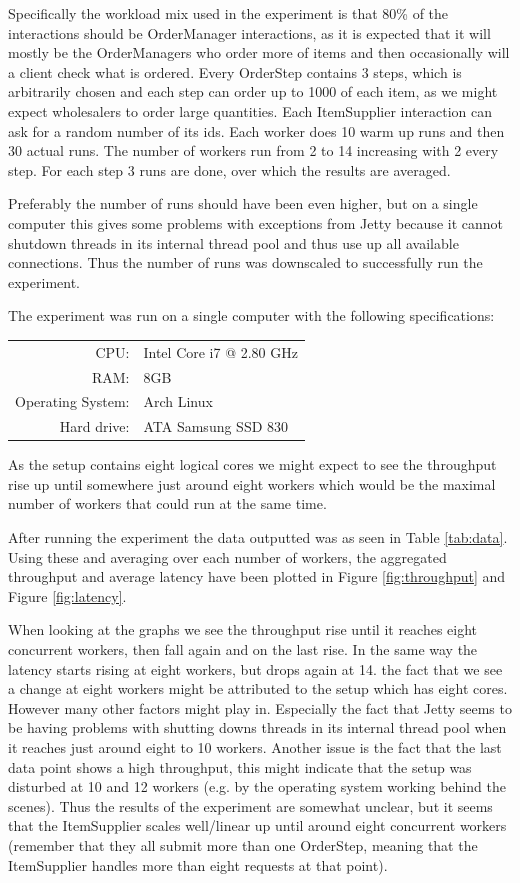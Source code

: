 \documentclass[a4paper, 11pt]{article}
\begin{document}
Specifically the workload mix used in the experiment is that 80\% of the interactions should be OrderManager interactions, as it is expected that it will mostly be the OrderManagers who order more of items and then occasionally will a client check what is ordered. Every OrderStep contains 3 steps, which is arbitrarily chosen and each step can order up to 1000 of each item, as we might expect wholesalers to order large quantities. Each ItemSupplier interaction can ask for a random number of its ids. Each worker does 10 warm up runs and then 30 actual runs. The number of workers run from 2 to 14 increasing with 2 every step. For each step 3 runs are done, over which the results are averaged.

Preferably the number of runs should have been even higher, but on a single computer this gives some problems with exceptions from Jetty because it cannot shutdown threads in its internal thread pool and thus use up all available connections. Thus the number of runs was downscaled to successfully run the experiment.

The experiment was run on a single computer with the following specifications:
\begin{table}[H]
\centering
\begin{tabular}{rl}
CPU: & Intel Core i7 @ 2.80 GHz \\
RAM: & 8GB \\
Operating System: & Arch Linux \\
Hard drive: & ATA Samsung SSD 830 \\
\end{tabular}
\end{table}
As the setup contains eight logical cores we might expect to see the throughput rise up until somewhere just around eight workers which would be the maximal number of workers that could run at the same time.

After running the experiment the data outputted was as seen in Table \ref{tab:data}. Using these and averaging over each number of workers, the aggregated throughput and average latency have been plotted in Figure \ref{fig:throughput} and Figure \ref{fig:latency}.

When looking at the graphs we see the throughput rise until it reaches eight concurrent workers, then fall again and on the last rise. In the same way the latency starts rising at eight workers, but drops again at 14. the fact that we see a change at eight workers might be attributed to the setup which has eight cores. However many other factors might play in. Especially the fact that Jetty seems to be having problems with shutting downs threads in its internal thread pool when it reaches just around eight to 10 workers. Another issue is the fact that the last data point shows a high throughput, this might indicate that the setup was disturbed at 10 and 12 workers (e.g. by the operating system working behind the scenes). Thus the results of the experiment are somewhat unclear, but it seems that the ItemSupplier scales well/linear up until around eight concurrent workers (remember that they all submit more than one OrderStep, meaning that the ItemSupplier handles more than eight requests at that point).
\end{document}

